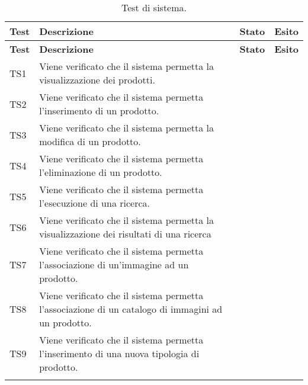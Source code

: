 {
	\def\arraystretch{1.5}
	\begin{longtable}{p{1.5cm}!{\VRule[1pt]}p{5cm}!{\VRule[1pt]}p{1cm}!{\VRule[1pt]}p{1cm}}
		\color{white} \textbf{Test} & \color{white} \textbf{Descrizione} & \color{white} \textbf{Stato} & \color{white} \textbf{Esito} \\ 
		\endfirsthead 
		\color{white} \textbf{Test} & \color{white} \textbf{Descrizione} & \color{white} \textbf{Stato} & \color{white} \textbf{Esito} \\ 
		\endhead 
		TS1 & Viene verificato che il sistema permetta la visualizzazione dei prodotti. & \impl & \super \\ 
		TS2 & Viene verificato che il sistema permetta l'inserimento di un prodotto. & \impl & \super \\
		TS3 & Viene verificato che il sistema permetta la modifica di un prodotto. & \impl & \super \\
		TS4 & Viene verificato che il sistema permetta l'eliminazione di un prodotto. & \impl & \super \\
		TS5 & Viene verificato che il sistema permetta l'esecuzione di una ricerca. & \impl & \super \\
		TS6 & Viene verificato che il sistema permetta la visualizzazione dei risultati di una ricerca & \impl & \super \\ 
		TS7 & Viene verificato che il sistema permetta l'associazione di un'immagine ad un prodotto. & \impl & \super \\ 
		TS8 & Viene verificato che il sistema permetta l'associazione di un catalogo di immagini ad un prodotto. & \nonimpl & \nonsuper \\
		TS9 & Viene verificato che il sistema permetta l'inserimento di una nuova tipologia di prodotto. & \nonimpl & \nonsuper \\
		\caption{Test di sistema.}
	\end{longtable}
}